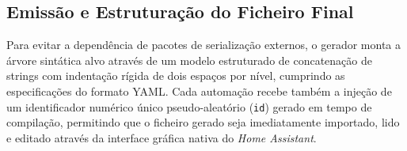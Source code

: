 \documentclass[12pt, a4paper]{article}
\begin{document}
\subsection{Emissão e Estruturação do Ficheiro Final}
Para evitar a dependência de pacotes de serialização externos, o gerador monta a árvore sintática alvo através de um modelo estruturado de concatenação de strings com indentação rígida de dois espaços por nível, cumprindo as especificações do formato YAML. Cada automação recebe também a injeção de um identificador numérico único pseudo-aleatório (\texttt{id}) gerado em tempo de compilação, permitindo que o ficheiro gerado seja imediatamente importado, lido e editado através da interface gráfica nativa do \textit{Home Assistant}.
\end{document}
